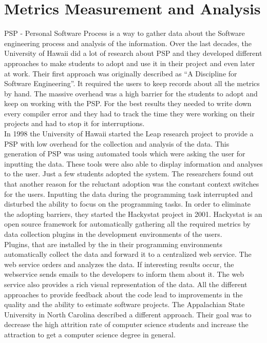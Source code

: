 \section{Metrics Measurement and Analysis}
PSP - Personal Software Process is a way to gather data about the Software engineering process and analysis of the information.
Over the last decades, the University of Hawaii did a lot of research about PSP and they developed different approaches to make students to adopt and use it in their project and even later at work.
Their first approach was originally described as ``A Discipline for Software Engineering''. It required the users to keep records about all the metrics by hand. The massive overhead was a high barrier for the students to adopt and keep on working with the PSP. For the best results they needed to write down every compiler error and they had to track the time they were working on their projects and had to stop it for interruptions.\\
In 1998 the University of Hawaii started the Leap research project to provide a PSP with low overhead for the collection and analysis of the data. This generation of PSP was using automated tools which were asking the user for inputting the data. These tools were also able to display information and analyses to the user.
Just a few students adopted the system. The researchers found out that another reason for the reluctant adoption was the constant context switches for the users. Inputting the data during the programming task interrupted and disturbed the ability to focus on the programming tasks. \cite{johnson2003beyond}
In order to eliminate the adopting barriers, they started the Hackystat project in 2001. Hackystat is an open source framework for automatically gathering all the required metrics by data collection plugins in the development environments of the users.\\
Plugins, that are installed by the in their programming environments automatically collect the data and forward it to a centralized web service. The web service orders and analyzes the data. If interesting results occur, the webservice sends emails to the developers to inform them about it. The web service also provides a rich visual representation of the data.
All the different approaches to provide feedback about the code lead to improvements in the quality and the ability to estimate software projects. \cite{johnson2001project} 
The Appalachian State University in North Carolina described a different approach. Their goal was to decrease the high attrition rate of computer science students and increase the attraction to get a computer science degree in general.\\

